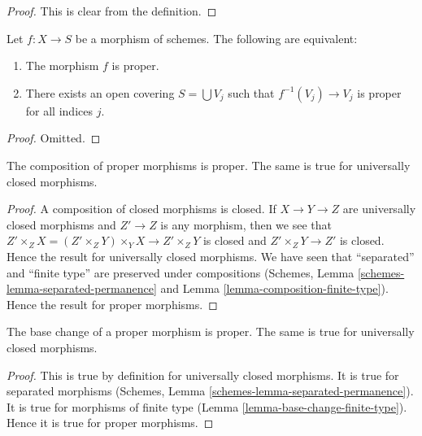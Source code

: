 \begin{proof}
This is clear from the definition.
\end{proof}

\begin{lemma}
\label{lemma-proper-local-on-the-base}
Let $f : X \to S$ be a morphism of schemes.
The following are equivalent:
\begin{enumerate}
\item The morphism $f$ is proper.
\item There exists an open covering $S = \bigcup V_j$ such
that $f^{-1}(V_j) \to V_j$ is proper for all indices $j$.
\end{enumerate}
\end{lemma}

\begin{proof}
Omitted.
\end{proof}

\begin{lemma}
\label{lemma-composition-proper}
The composition of proper morphisms is proper.
The same is true for universally closed morphisms.
\end{lemma}

\begin{proof}
A composition of closed morphisms is closed.
If $X \to Y \to Z$ are universally closed morphisms
and $Z' \to Z$ is any morphism, then we see that
$Z' \times_Z X = (Z' \times_Z Y) \times_Y X  \to Z' \times_Z Y$
is closed and $Z' \times_Z Y \to Z'$ is closed.
Hence the result for universally closed morphisms.
We have seen that ``separated'' and ``finite type''
are preserved under compositions
(Schemes, Lemma \ref{schemes-lemma-separated-permanence} and
Lemma \ref{lemma-composition-finite-type}). Hence the
result for proper morphisms.
\end{proof}

\begin{lemma}
\label{lemma-base-change-proper}
The base change of a proper morphism is proper.
The same is true for universally closed morphisms.
\end{lemma}

\begin{proof}
This is true by definition for universally closed morphisms.
It is true for separated morphisms
(Schemes, Lemma \ref{schemes-lemma-separated-permanence}).
It is true for morphisms of finite type
(Lemma \ref{lemma-base-change-finite-type}).
Hence it is true for proper morphisms.
\end{proof}

